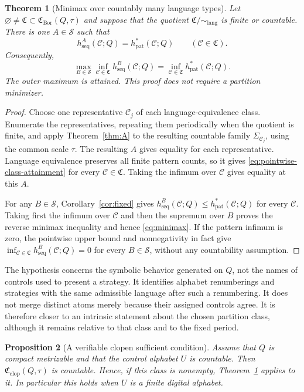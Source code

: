 \documentclass[11pt,reqno]{amsart}
\numberwithin{equation}{section}
\newtheorem{theorem}{Theorem}[section]
\newtheorem{proposition}[theorem]{Proposition}
\theoremstyle{definition}
\newcommand{\C}{\mathcal C}
\newcommand{\hseq}{h_{\mathrm{seq}}}
\newcommand{\hpat}{h_{\mathrm{pat}}^{*}}
\newcommand{\Bor}{\mathrm{Bor}}
\newcommand{\clop}{\mathrm{clop}}
\newcommand{\lang}{\mathrm{lang}}
\begin{document}
\begin{theorem}[Minimax over countably many language types]\label{thm:B}
Let $\varnothing\ne\mathfrak C\subset\mathfrak C_{\Bor}(Q,\tau)$ and suppose
that the quotient $\mathfrak C/{\sim_{\lang}}$ is finite or countable.  There
is one $A\in\mathscr S$ such that
\begin{equation}\label{eq:pointwise-class-attainment}
 \hseq^A(\C;Q)=\hpat(\C;Q)
 \qquad(\C\in\mathfrak C).
\end{equation}
Consequently,
\begin{equation}\label{eq:minimax}
 \max_{B\in\mathscr S}\inf_{\C\in\mathfrak C}
 \hseq^B(\C;Q)
 =\inf_{\C\in\mathfrak C}\hpat(\C;Q).
\end{equation}
The outer maximum is attained. This proof does not require a partition minimizer.
\end{theorem}

\begin{proof}
Choose one representative $\C_j$ of each language-equivalence class.
Enumerate the representatives, repeating them periodically when the quotient
is finite, and apply Theorem~\ref{thm:A} to the resulting countable family
$\Sigma_{\C_j}$, using the common scale $\tau$.  The resulting $A$ gives equality for each
representative.  Language equivalence preserves all finite pattern counts, so
it gives \eqref{eq:pointwise-class-attainment} for every $\C\in\mathfrak C$.
Taking the infimum over $\C$ gives equality at this $A$.

For any $B\in\mathscr S$, Corollary~\ref{cor:fixed} gives
$\hseq^B(\C;Q)\le\hpat(\C;Q)$ for every $\C$.  Taking first the infimum over
$\C$ and then the supremum over $B$ proves the reverse minimax inequality and
hence \eqref{eq:minimax}.  If the pattern infimum is zero, the pointwise upper
bound and nonnegativity in fact give
$\inf_{\C\in\mathfrak C}\hseq^B(\C;Q)=0$ for every $B\in\mathscr S$, without
any countability assumption.
\end{proof}

The hypothesis concerns the symbolic behavior generated on $Q$, not the
names of controls used to present a strategy.  It identifies alphabet renumberings and strategies with the same
admissible language after such a renumbering. It does not merge distinct
atoms merely because their assigned controls agree.  It is therefore closer to an intrinsic
statement about the chosen partition class, although it remains relative to
that class and to the fixed period.

\begin{proposition}[A verifiable clopen sufficient condition]
\label{prop:digital}
Assume that $Q$ is compact metrizable and that the control alphabet $U$ is
countable.  Then
$\mathfrak C_{\clop}(Q,\tau)$ is countable.  Hence, if this class is nonempty,
Theorem~\ref{thm:B} applies to it.  In particular this holds when $U$ is a
finite digital alphabet.
\end{proposition}
\end{document}
